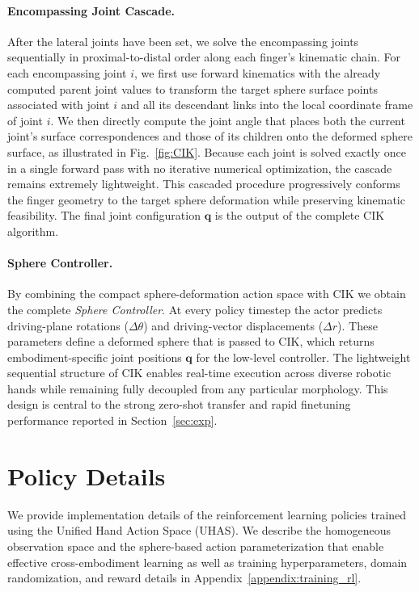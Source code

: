 \paragraph{Encompassing Joint Cascade.}
After the lateral joints have been set, we solve the encompassing joints sequentially in proximal-to-distal order along each finger’s kinematic chain. For each encompassing joint $i$, we first use forward kinematics with the already computed parent joint values to transform the target sphere surface points associated with joint $i$ and all its descendant links into the local coordinate frame of joint $i$. We then directly compute the joint angle that places both the current joint’s surface correspondences and those of its children onto the deformed sphere surface, as illustrated in Fig.~\ref{fig:CIK}. Because each joint is solved exactly once in a single forward pass with no iterative numerical optimization, the cascade remains extremely lightweight. This cascaded procedure progressively conforms the finger geometry to the target sphere deformation while preserving kinematic feasibility. The final joint configuration $\mathbf{q}$ is the output of the complete CIK algorithm.

\paragraph{Sphere Controller.}
By combining the compact sphere-deformation action space with CIK we obtain the complete \emph{Sphere Controller}. At every policy timestep the actor predicts driving-plane rotations ($\Delta\theta$) and driving-vector displacements ($\Delta r$). These parameters define a deformed sphere that is passed to CIK, which returns embodiment-specific joint positions $\mathbf{q}$ for the low-level controller. The lightweight sequential structure of CIK enables real-time execution across diverse robotic hands while remaining fully decoupled from any particular morphology. This design is central to the strong zero-shot transfer and rapid finetuning performance reported in Section~\ref{sec:exp}.


\section{Policy Details}
\label{appendix:training}
We provide implementation details of the reinforcement learning policies trained using the Unified Hand Action Space (UHAS). We describe the homogeneous observation space and the sphere-based action parameterization that enable effective cross-embodiment learning as well as training hyperparameters, domain randomization, and reward details in Appendix~\ref{appendix:training_rl}. 

